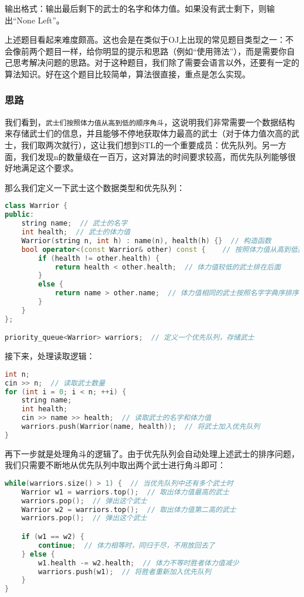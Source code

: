 \documentclass[../main.tex]{subfiles}
\begin{document}
输出格式：输出最后剩下的武士的名字和体力值。如果没有武士剩下，则输出“None Left”。

上述题目看起来难度颇高。这也会是在类似于OJ上出现的常见题目类型之一：不会像前两个题目一样，给你明显的提示和思路（例如“使用筛法”），而是需要你自己思考解决问题的思路。对于这种题目，我们除了需要会语言以外，还要有一定的算法知识。好在这个题目比较简单，算法很直接，重点是怎么实现。

\subsubsection{思路}
我们看到，\texttt{武士们按照体力值从高到低的顺序角斗}，这说明我们非常需要一个数据结构来存储武士们的信息，并且能够不停地获取体力最高的武士（对于体力值次高的武士，我们取两次就行），这让我们想到STL的一个重要成员：优先队列。另一方面，我们发现n的数量级在一百万，这对算法的时间要求较高，而优先队列能够很好地满足这个要求。

那么我们定义一下武士这个数据类型和优先队列：
\begin{lstlisting}[language=C++]
class Warrior {
public:
    string name;  // 武士的名字
    int health;  // 武士的体力值
    Warrior(string n, int h) : name(n), health(h) {}  // 构造函数
    bool operator<(const Warrior& other) const {    // 按照体力值从高到低排序
        if (health != other.health) {
            return health < other.health;  // 体力值较低的武士排在后面
        }
        else {
            return name > other.name;  // 体力值相同的武士按照名字字典序排序
        }
    }
};

priority_queue<Warrior> warriors;  // 定义一个优先队列，存储武士
\end{lstlisting}

接下来，处理读取逻辑：
\begin{lstlisting}[language=C++]
int n;
cin >> n;  // 读取武士数量
for (int i = 0; i < n; ++i) {
    string name;
    int health;
    cin >> name >> health;  // 读取武士的名字和体力值
    warriors.push(Warrior(name, health));  // 将武士加入优先队列
}
\end{lstlisting}

再下一步就是处理角斗的逻辑了。由于优先队列会自动处理上述武士的排序问题，我们只需要不断地从优先队列中取出两个武士进行角斗即可：
\begin{lstlisting}[language=C++]
while(warriors.size() > 1) {  // 当优先队列中还有多个武士时
    Warrior w1 = warriors.top();  // 取出体力值最高的武士
    warriors.pop();  // 弹出这个武士
    Warrior w2 = warriors.top();  // 取出体力值第二高的武士
    warriors.pop();  // 弹出这个武士

    if (w1 == w2) {
        continue;  // 体力相等时，同归于尽，不用放回去了
    } else {
        w1.health -= w2.health;  // 体力不等时胜者体力值减少
        warriors.push(w1);  // 将胜者重新加入优先队列
    }
}
\end{lstlisting}
\end{document}
